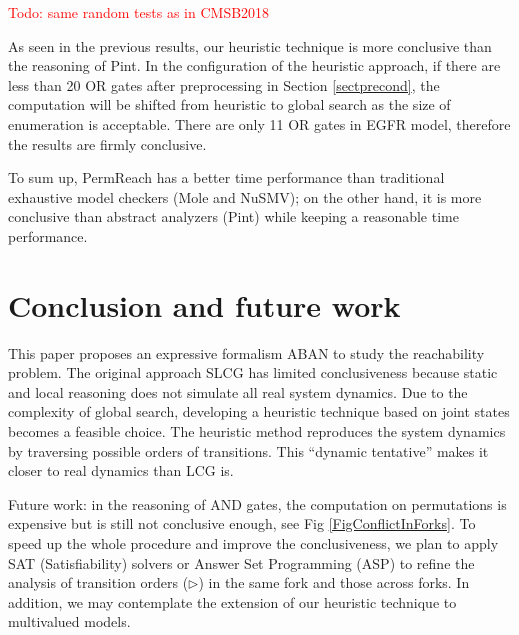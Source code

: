 \documentclass[runningheads]{llncs}
\begin{document}
\textcolor{red}{Todo: same random tests as in CMSB2018}


As seen in the previous results, our heuristic technique is more conclusive than the reasoning of Pint. 
In the configuration of the heuristic approach, if there are less than 20 OR gates after preprocessing in Section \ref{sectprecond}, the computation will be shifted from heuristic to global search as the size of enumeration is acceptable.
There are only 11 OR gates in EGFR model, therefore the results are firmly conclusive. 


To sum up, PermReach has a better time performance than traditional exhaustive model checkers (Mole and NuSMV); on the other hand, it is more conclusive than abstract analyzers (Pint) while keeping a reasonable time performance.

\section{Conclusion and future work}\label{sect:6}
This paper proposes an expressive formalism ABAN to study the reachability problem. 
The original approach SLCG has limited conclusiveness because static and local reasoning does not simulate all real system dynamics. 
Due to the complexity of global search, developing a heuristic technique based on joint states becomes a feasible choice.
The heuristic method reproduces the system dynamics by traversing possible orders of transitions. 
This ``dynamic tentative'' makes it closer to real dynamics than LCG is.

Future work: in the reasoning of AND gates, the computation on permutations is expensive but is still not conclusive enough, see Fig \ref{FigConflictInForks}. 
To speed up the whole procedure and improve the conclusiveness, we plan to apply SAT (Satisfiability) solvers or Answer Set Programming (ASP) to refine the analysis of transition orders ($\triangleright$) in the same fork and those across forks. 
In addition, we may contemplate the extension of our heuristic technique to multivalued models.
\appendix
\end{document}
